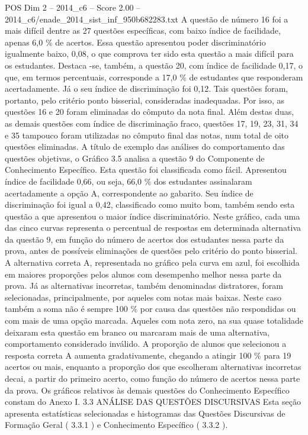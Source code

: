 \begin{textsample}{POS Dim 2 – 2014\_c6 – Score 2.00 – 2014\_c6/enade\_2014\_sist\_inf\_950b682283.txt}
A questão de número 16 foi a mais difícil dentre as 27 questões específicas, com baixo índice de facilidade, apenas 6,0 \% de acertos.
Essa questão apresentou poder discriminatório igualmente baixo, 0,08, o que comprova ter sido esta questão a mais difícil para os estudantes.
Destaca -se, também, a questão 20, com índice de facilidade 0,17, o que, em termos percentuais, corresponde a 17,0 \% de estudantes que responderam acertadamente.
Já o seu índice de discriminação foi 0,12.
Tais questões foram, portanto, pelo critério ponto bisserial, consideradas inadequadas.
Por isso, as questões 16 e 20 foram eliminadas do cômputo da nota final.
Além destas duas, as demais questões com índice de discriminação fraco, questões 17, 19, 23, 31, 34 e 35 tampouco foram utilizadas no cômputo final das notas, num total de oito questões eliminadas.
A título de exemplo das análises do comportamento das questões objetivas, o Gráfico 3.5 analisa a questão 9 do Componente de Conhecimento Específico.
Esta questão foi classificada como fácil.
Apresentou índice de facilidade 0,66, ou seja, 66,0 \% dos estudantes assinalaram acertadamente a opção A, correspondente ao gabarito.
Seu índice de discriminação foi igual a 0,42, classificado como muito bom, também sendo esta questão a que apresentou o maior índice discriminatório.
Neste gráfico, cada uma das cinco curvas representa o percentual de respostas em determinada alternativa da questão 9, em função do número de acertos dos estudantes nessa parte da prova, antes de possíveis eliminações de questões pelo critério do ponto bisserial.
A alternativa correta A, representada no gráfico pela curva em azul, foi escolhida em maiores proporções pelos alunos com desempenho melhor nessa parte da prova.
Já as alternativas incorretas, também denominadas distratores, foram selecionadas, principalmente, por aqueles com notas mais baixas.
Neste caso também a soma não é sempre 100 \% por causa das questões não respondidas ou com mais de uma opção marcada.
Aqueles com nota zero, na sua quase totalidade deixaram esta questão em branco ou marcaram mais de uma alternativa, comportamento considerado inválido.
A proporção de alunos que selecionou a resposta correta A aumenta gradativamente, chegando a atingir 100 \% para 19 acertos ou mais, enquanto a proporção dos que escolheram alternativas incorretas decai, a partir do primeiro acerto, como função do número de acertos nessa parte da prova.
Os gráficos relativos às demais questões do Conhecimento Específico constam do Anexo I. 3.3 ANÁLISE DAS QUESTÕES DISCURSIVAS Esta seção apresenta estatísticas selecionadas e histogramas das Questões Discursivas de Formação Geral ( 3.3.1 ) e Conhecimento Específico ( 3.3.2 ).

\end{textsample}
